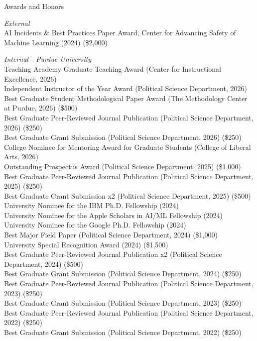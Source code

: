 \documentclass{resume} %
\begin{document}
\begin{rSection}{Awards and Honors}

{\it External}
\\AI Incidents \& Best Practices Paper Award, Center for Advancing Safety of Machine Learning (2024) (\$2,000)

{\it Internal - Purdue University}
\\Teaching Academy Graduate Teaching Award (Center for Instructional Excellence, 2026)
\\Independent Instructor of the Year Award (Political Science Department, 2026)
\\Best Graduate Student Methodological Paper Award (The Methodology Center at Purdue, 2026) (\$500)
\\Best Graduate Peer-Reviewed Journal Publication (Political Science Department, 2026) (\$250)
\\Best Graduate Grant Submission (Political Science Department, 2026) (\$250)
\\College Nominee for Mentoring Award for Graduate Students (College of Liberal Arts, 2026)
\\Outstanding Prospectus Award (Political Science Department, 2025) (\$1,000)
\\Best Graduate Peer-Reviewed Journal Publication (Political Science Department, 2025) (\$250)
\\Best Graduate Grant Submission x2 (Political Science Department, 2025) (\$500)
\\University Nominee for the IBM Ph.D. Fellowship (2024)
\\University Nominee for the Apple Scholars in AI/ML Fellowship (2024)
\\University Nominee for the Google Ph.D. Fellowship (2024)
\\Best Major Field Paper (Political Science Department, 2024) (\$1,000)
\\University Special Recognition Award (2024) (\$1,500)
\\Best Graduate Peer-Reviewed Journal Publication x2 (Political Science Department, 2024) (\$500)
\\Best Graduate Grant Submission (Political Science Department, 2024) (\$250)
\\Best Graduate Peer-Reviewed Journal Publication (Political Science Department, 2023) (\$250)
\\Best Graduate Grant Submission (Political Science Department, 2023) (\$250)
\\Best Graduate Peer-Reviewed Journal Publication (Political Science Department, 2022) (\$250)
\\Best Graduate Grant Submission (Political Science Department, 2022) (\$250)


\end{rSection}
\end{document}
